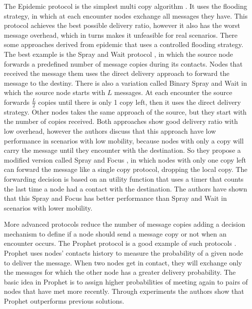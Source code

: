 The Epidemic protocol is the simplest multi copy algorithm \cite{vahdat2000epidemic}. It uses the flooding strategy, in which at each encounter nodes exchange all messages they have.
This protocol achieves the best possible delivery ratio, however it also has the worst message overhead, which in turns makes it unfeasible for real scenarios. There some approaches
derived from epidemic that uses a controlled flooding strategy. The best example is the Spray and Wait protocol \cite{spyropoulos2005spray}, in which the source node forwards a predefined
number of message copies during its contacts. Nodes that received the message them uses the direct delivery approach to forward the message to the destiny. There is also a variation called Binary Spray and Wait \cite{spyropoulos2005spray} in which
the source node starts with $L$ messages. At each encounter the source forwards $\frac{L}{2}$ copies until there is only 1 copy left, then it uses the direct delivery strategy. Other nodes
takes the same approach of the source, but they start with the number of copies received. Both approaches show good delivery ratio with low overhead, however the authors discuss that
this approach have low performance in scenarios with low mobility, because nodes with only a copy will carry the message until they encounter with the destination. So they propose a
modified version called Spray and Focus \cite{spyropoulos2007spray}, in which nodes with only one copy left can forward the message like a single copy protocol, dropping the local copy.
The forwarding decision is based on an utility function that uses a timer that counts the last time a node had a contact with the destination. The authors have shown that this Spray and Focus
has better performance than Spray and Wait in scenarios with lower mobility.

More advanced protocols reduce the number of message copies adding a decision mechanism to define if a node should send a message copy or not when an encounter occurs. The Prophet protocol
is a good example of such protocols \cite{lindgren2003probabilistic}. Prophet uses nodes' contacts history to measure the probability of a given node to deliver the message. When two nodes
get in contact, they will exchange only the messages for which the other node has a greater delivery probability. The basic idea in Prophet is to assign higher probabilities of meeting
again to pairs of nodes that have met more recently. Through experiments the authors show that Prophet outperforms previous solutions.

